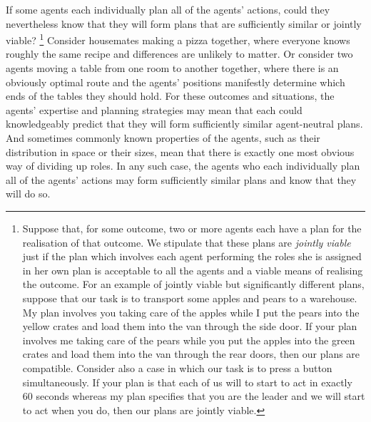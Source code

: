 \documentclass[12pt,\papersize]{extarticle}
\begin{document}
If some agents each individually plan all of the agents' actions, 
could they nevertheless know  that they will form plans that are sufficiently similar or jointly viable?%
\footnote{
\label{fn:df_jointly_viable}
Suppose that, for some outcome, two or more agents each have a plan for the realisation of that outcome. 
We stipulate that these plans are  \emph{jointly viable} just if
the plan which involves each agent performing the roles she is assigned in her own plan is acceptable to all the agents and a viable means of realising the outcome.
For an example of jointly viable but significantly different plans, suppose that our task is to transport some apples and pears to a warehouse. 
My plan involves you taking care of the apples while I put the pears into the yellow crates and load them into the van through the side door.
If your plan involves me taking care of the pears while you put the apples into the green crates and load them into the van through the rear doors, then our plans are compatible.
Consider also a case in which our task is to press a button simultaneously. 
If your plan is that each of us will to start to act in exactly 60 seconds whereas my plan specifies that you are the leader and we will start to act when you do, then our plans are jointly viable.
}
Consider housemates
	making a pizza together, where everyone knows roughly the same recipe and differences are unlikely to matter.
Or consider two agents 
 moving  a table from one room to another together, where there is an obviously optimal route and the agents' positions manifestly determine which ends of the tables they should hold.
For these outcomes and situations,
 the agents' expertise and planning strategies 
 may mean that each could knowledgeably predict that they will form sufficiently similar agent-neutral plans.
And sometimes commonly known properties of the agents, such as their distribution in space or their sizes, mean that there is exactly one most obvious way of dividing up roles.
In any such case, the agents who each individually plan all of the agents' actions may form sufficiently similar plans and know that they will do so.
\end{document}
